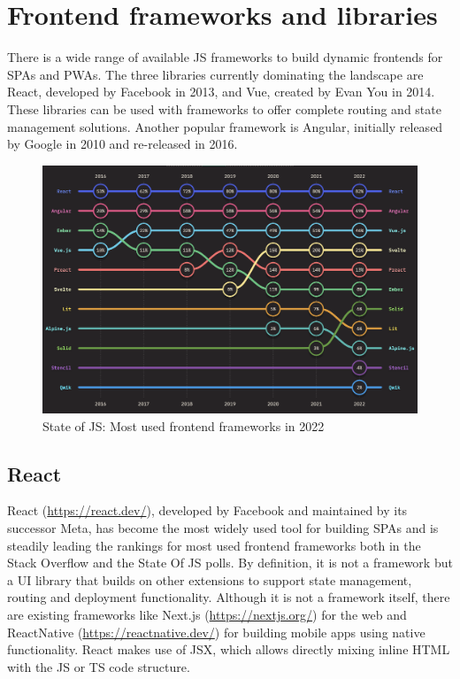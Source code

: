 \section{Frontend frameworks and libraries}

There is a wide range of available \ac{JS} frameworks to build dynamic frontends for \ac{SPA}s and \ac{PWA}s. The three libraries currently dominating the landscape are React, developed by Facebook in 2013, and Vue, created by Evan You in 2014. These libraries can be used with frameworks to offer complete routing and state management solutions. Another popular framework is Angular, initially released by Google in 2010 and re-released in 2016.

\begin{figure}[h]
    \centering
    \includegraphics[scale=0.4]{04_Artefakte/01_Abbildungen/stateofjs-usage-frontend-frameworks-2022}
    \caption[Most used frontend frameworks in 2022]{State of JS: Most used frontend frameworks in 2022\protect\footnotemark}
    \label{fig:mostUsedFrameworks}
\end{figure}

\subsection{React}

React (\url{https://react.dev/}), developed by Facebook and maintained by its successor Meta, has become the most widely used tool for building \ac{SPA}s and is steadily leading the rankings for most used frontend frameworks both in the Stack Overflow \parencite{stackOverflowPollWebFrameworks23} and the State Of JS \parencite{mostUsedFrontendFrameworks22} polls. By definition, it is not a framework but a \ac{UI} library that builds on other extensions to support state management, routing and deployment functionality. Although it is not a framework itself, there are existing frameworks like Next.js (\url{https://nextjs.org/}) for the web and ReactNative (\url{https://reactnative.dev/}) for building mobile apps using native functionality. React makes use of \ac{JSX}, which allows directly mixing inline \ac{HTML} with the \ac{JS} or \ac{TS} code structure.

